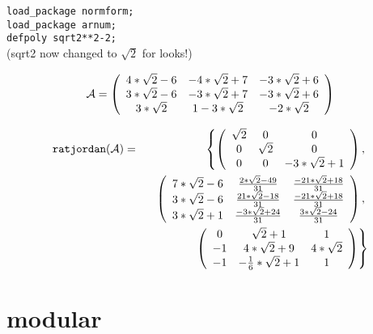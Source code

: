{\tt load\_package normform;} \\
{\tt load\_package arnum;} \\
{\tt defpoly sqrt2**2-2;} \\
(sqrt2 now changed to ${\sqrt{2}}$ for looks!)
\vspace{0.2in}

\begin{displaymath}
{\cal A} = \left( \begin{array}{ccc} 4*{\sqrt{2}}-6 & -4*{\sqrt{2}}+7 &
-3*{\sqrt{2}}+6 \\ 3*{\sqrt{2}}-6 & -3*{\sqrt{2}}+7 & -3*{\sqrt{2}}+6
\\ 3*{\sqrt{2}} & 1-3*{\sqrt{2}} & -2*{\sqrt{2}}   \end{array} \right)
\end{displaymath}
\vspace{0.2in}

\begin{eqnarray}
{\tt ratjordan}({\cal A}) & = &
\left\{ \left( \begin{array}{ccc} {\sqrt{2}} & 0 & 0 \\ 0 & {\sqrt{2}}
& 0 \\ 0 & 0 & -3*{\sqrt{2}}+1 \end{array} \right), \right. \nonumber
\\ & & \hspace{0.1in} \left. \left( \begin{array}{ccc} 7*{\sqrt{2}}-6
& \frac{2*{\sqrt{2}}-49}{31} & \frac{-21*{\sqrt{2}}+18}{31} \\
3*{\sqrt{2}}-6 & \frac{21*{\sqrt{2}}-18}{31} & \frac{-21*{\sqrt{2}}+18}
{31} \\ 3*{\sqrt{2}}+1 & \frac{-3*{\sqrt{2}}+24}{31} &
\frac{3*{\sqrt{2}}-24}{31} \end{array} \right), \right. \nonumber \\ &
& \hspace{0.1in} \left. \left( \begin{array}{ccc} 0 & {\sqrt{2}}+1 &
1 \\ -1 & 4*{\sqrt{2}}+9 & 4*{\sqrt{2}} \\ -1 & -\frac{1}{6}*{\sqrt{2}}
+1 & 1 \end{array} \right) \right\} \nonumber
\end{eqnarray}

\newpage


\section{modular}

